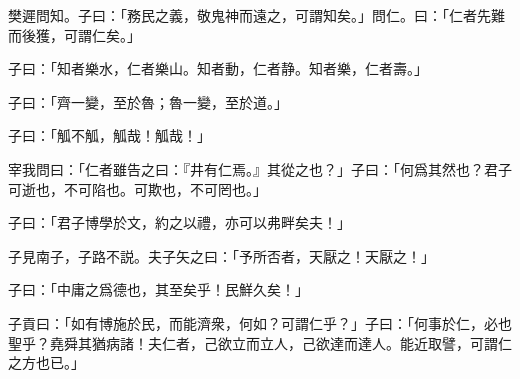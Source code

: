 樊遲問知。子曰：「務民之義，敬鬼神而遠之，可謂知矣。」問仁。曰：「仁者先難而後獲，可謂仁矣。」

子曰：「知者樂水，仁者樂山。知者動，仁者静。知者樂，仁者壽。」

子曰：「齊一變，至於魯；魯一變，至於道。」

子曰：「觚不觚，觚哉！觚哉！」

宰我問曰：「仁者雖告之曰：『井有仁焉。』其從之也？」子曰：「何爲其然也？君子可逝也，不可陷也。可欺也，不可罔也。」

子曰：「君子博學於文，約之以禮，亦可以弗畔矣夫！」

子見南子，子路不説。夫子矢之曰：「予所否者，天厭之！天厭之！」

子曰：「中庸之爲德也，其至矣乎！民鮮久矣！」

子貢曰：「如有博施於民，而能濟衆，何如？可謂仁乎？」子曰：「何事於仁，必也聖乎？堯舜其猶病諸！夫仁者，己欲立而立人，己欲達而達人。能近取譬，可謂仁之方也已。」
